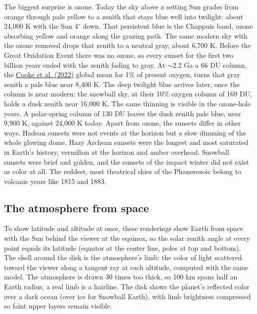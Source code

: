 \documentclass[9pt,twocolumn]{extarticle}
\begin{document}
The biggest surprise is ozone. Today the sky above a setting Sun grades from orange through pale yellow to a zenith that stays blue well into twilight: about 24,000 K with the Sun 4$^\circ$ down. That persistent blue is the Chappuis band, ozone absorbing yellow and orange along the grazing path. The same modern sky with the ozone removed drops that zenith to a neutral gray, about 6,700 K. Before the Great Oxidation Event there was no ozone, so every sunset for the first two billion years ended with the zenith fading to gray. At $\sim$2.2 Ga a 66 DU column, the \protect\hyperlink{cite.cooke2021}{Cooke et al. (2022)} global mean for 1\% of present oxygen, turns that gray zenith a pale blue near 8,400 K. The deep twilight blue arrives later, once the column is near modern: the snowball sky, at their 10\% oxygen column of 169 DU, holds a dusk zenith near 16,000 K. The same thinning is visible in the ozone-hole years. A polar-spring column of 130 DU leaves the dusk zenith pale blue, near 9,900 K, against 24,000 K today. Apart from ozone, the sunsets differ in other ways. Hadean sunsets were not events at the horizon but a slow dimming of the whole glowing dome. Hazy Archean sunsets were the longest and most saturated in Earth's history, vermilion at the horizon and amber overhead. Snowball sunsets were brief and golden, and the sunsets of the impact winter did not exist as color at all. The reddest, most theatrical skies of the Phanerozoic belong to volcanic years like 1815 and 1883.


\subsection{The atmosphere from space}\label{from-space}

To show latitude and altitude at once, these renderings show Earth from space with the Sun behind the viewer at the equinox, so the solar zenith angle at every point equals its latitude (equator at the center line, poles at top and bottom). The shell around the disk is the atmosphere's limb: the color of light scattered toward the viewer along a tangent ray at each altitude, computed with the same model. The atmosphere is drawn 30 times too thick, so 100 km spans half an Earth radius; a real limb is a hairline. The disk shows the planet's reflected color over a dark ocean (over ice for Snowball Earth), with limb brightness compressed so faint upper layers remain visible.
\end{document}
